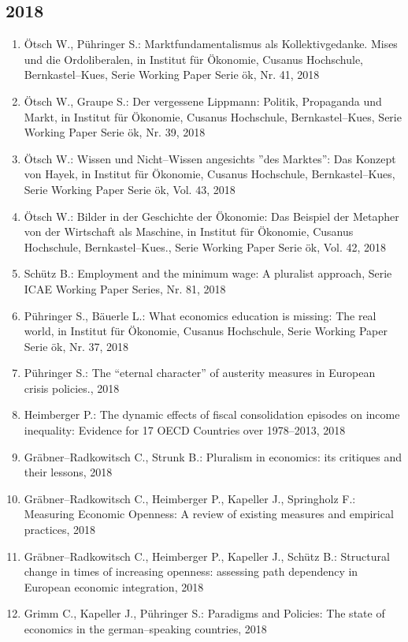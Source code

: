 \subsection*{2018}
\begin{enumerate}
    	 \item Ötsch W., Pühringer S.: Marktfundamentalismus als Kollektivgedanke. Mises und die Ordoliberalen, in Institut für Ökonomie, Cusanus Hochschule, Bernkastel--Kues, Serie Working Paper Serie ök, Nr. 41, 2018
	 \item Ötsch W., Graupe S.: Der vergessene Lippmann: Politik, Propaganda und Markt, in Institut für Ökonomie, Cusanus Hochschule, Bernkastel--Kues, Serie Working Paper Serie ök, Nr. 39, 2018
	 \item Ötsch W.: Wissen und Nicht--Wissen angesichts ''des Marktes'': Das Konzept von Hayek, in Institut für Ökonomie, Cusanus Hochschule, Bernkastel--Kues, Serie Working Paper Serie ök, Vol. 43, 2018
	 \item Ötsch W.: Bilder in der Geschichte der Ökonomie: Das Beispiel der Metapher von der Wirtschaft als Maschine, in Institut für Ökonomie, Cusanus Hochschule, Bernkastel--Kues., Serie Working Paper Serie ök, Vol. 42, 2018
	 \item Schütz B.: Employment and the minimum wage: A pluralist approach, Serie ICAE Working Paper Series, Nr. 81, 2018
	 \item Pühringer S., Bäuerle L.: What economics education is missing: The real world, in Institut für Ökonomie, Cusanus Hochschule, Serie Working Paper Serie ök, Nr. 37, 2018
	 \item Pühringer S.: The “eternal character” of austerity measures in European crisis policies., 2018
	 \item Heimberger P.: The dynamic effects of fiscal consolidation episodes on income inequality: Evidence for 17 OECD Countries over 1978--2013, 2018
	 \item Gräbner--Radkowitsch C., Strunk B.: Pluralism in economics: its critiques and their lessons, 2018
	 \item Gräbner--Radkowitsch C., Heimberger P., Kapeller J., Springholz F.: Measuring Economic Openness: A review of existing measures and empirical practices, 2018
	 \item Gräbner--Radkowitsch C., Heimberger P., Kapeller J., Schütz B.: Structural change in times of increasing openness: assessing path dependency in European economic integration, 2018
	 \item Grimm C., Kapeller J., Pühringer S.: Paradigms and Policies: The state of economics in the german--speaking countries, 2018

\end{enumerate}

